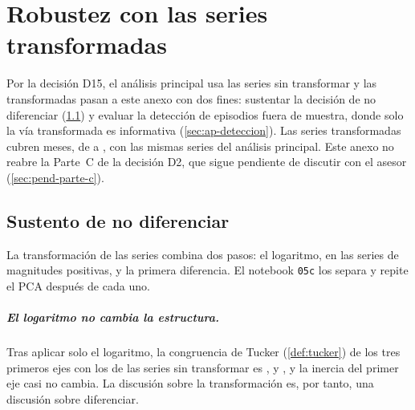 \chapter{Robustez con las series transformadas}
\label{ap:robustez}

Por la decisión D15, el análisis principal usa las series sin transformar y las transformadas
pasan a este anexo con dos fines: sustentar la decisión de no diferenciar
(\cref{sec:ap-no-diferenciar}) y evaluar la detección de episodios fuera de muestra, donde solo la
vía transformada es informativa (\cref{sec:ap-deteccion}). Las series transformadas cubren
\nMesesTransformadas{} meses, de \fechaInicioTransformadas{} a \fechaFinDatos{}, con las mismas
\nSeries{} series del análisis principal. Este anexo no reabre la Parte~C de la decisión D2, que
sigue pendiente de discutir con el asesor (\cref{sec:pend-parte-c}).

\section{Sustento de no diferenciar}
\label{sec:ap-no-diferenciar}

La transformación de las series combina dos pasos: el logaritmo, en las series de magnitudes
positivas, y la primera diferencia. El notebook \texttt{05c} los separa y repite el PCA después
de cada uno.

\paragraph{El logaritmo no cambia la estructura.} Tras aplicar solo el logaritmo, la congruencia
de Tucker (\cref{def:tucker}) de los tres primeros ejes con los de las series sin transformar es
\congruenciaLogPCUno{},
\congruenciaLogPCDos{}
y \congruenciaLogPCTres{},
y la inercia del primer eje casi no cambia. La discusión sobre la transformación es, por tanto,
una discusión sobre diferenciar.

